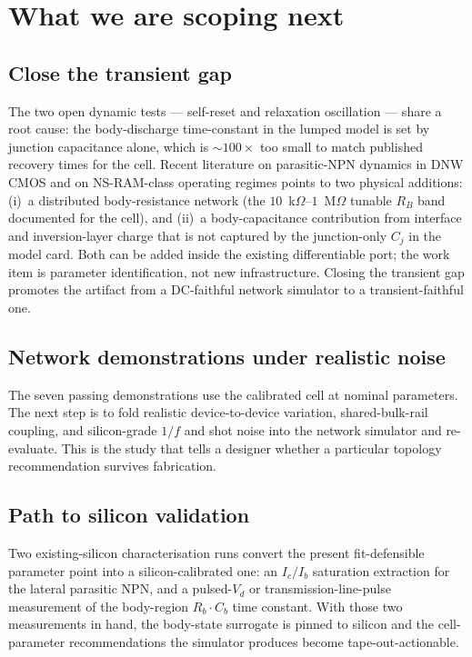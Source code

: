 \documentclass[fontsize=10pt]{article}
\begin{document}
\section{What we are scoping next}

\subsection{Close the transient gap}
The two open dynamic tests --- self-reset and relaxation
oscillation --- share a root cause: the body-discharge time-constant
in the lumped model is set by junction capacitance alone, which is
$\sim\!100\times$ too small to match published recovery times for
the cell.  Recent literature on parasitic-NPN dynamics in DNW CMOS
and on NS-RAM-class operating regimes points to two physical
additions: (i)~a distributed body-resistance network (the
$10$~k$\Omega$--$1$~M$\Omega$ tunable $R_B$ band documented for the
cell), and (ii)~a body-capacitance contribution from interface and
inversion-layer charge that is not captured by the junction-only
$C_j$ in the model card. Both can be added inside the existing
differentiable port; the work item is parameter identification, not
new infrastructure. Closing the transient gap promotes the artifact
from a DC-faithful network simulator to a transient-faithful one.

\subsection{Network demonstrations under realistic noise}
The seven passing demonstrations use the calibrated cell at nominal
parameters. The next step is to fold realistic device-to-device
variation, shared-bulk-rail coupling, and silicon-grade $1/f$ and
shot noise into the network simulator and re-evaluate.  This is the
study that tells a designer whether a particular topology
recommendation survives fabrication.

\subsection{Path to silicon validation}
Two existing-silicon characterisation runs convert the present
fit-defensible parameter point into a silicon-calibrated one: an
$I_c/I_b$ saturation extraction for the lateral parasitic NPN, and
a pulsed-$V_d$ or transmission-line-pulse measurement of the
body-region $R_b\!\cdot\!C_b$ time constant. With those two
measurements in hand, the body-state surrogate is pinned to silicon
and the cell-parameter recommendations the simulator produces become
tape-out-actionable.
\end{document}
